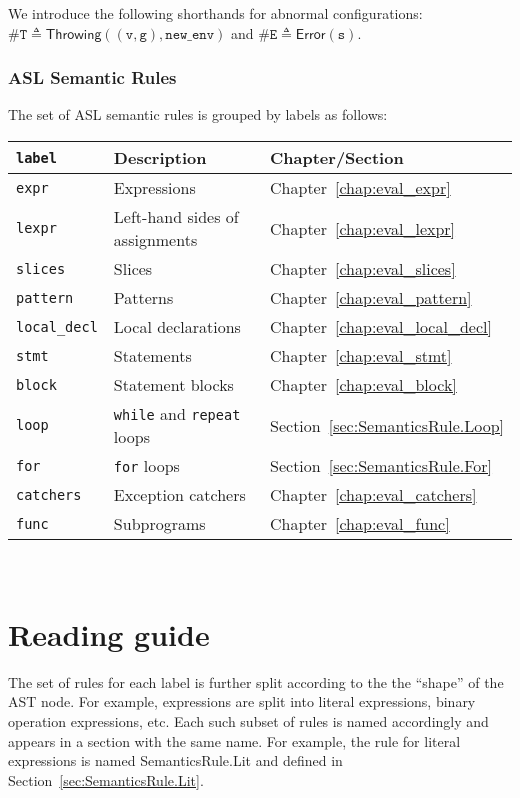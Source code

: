 \documentclass{book}
\newcommand\ExprThrowsConfig[0]{\texttt{\#T}}
\newcommand\ErrorConfig[0]{\texttt{\#E}}
\newcommand\Throwing[0]{\textsf{Throwing}}
\newcommand\Error[0]{\textsf{Error}}
\newcommand\newenv[0]{\texttt{new\_env}}
\newcommand\vg[0]{\texttt{g}}
\newcommand\vv[0]{\texttt{v}}
\newcommand\vs[0]{\texttt{s}}
\begin{document}
We introduce the following shorthands for abnormal configurations:
$\ExprThrowsConfig \triangleq \Throwing((\vv, \vg), \newenv)$
and $\ErrorConfig \triangleq \Error(\vs)$.

\subsection{ASL Semantic Rules}

The set of ASL semantic rules is grouped by labels as follows:

\begin{tabular}{lll}
\textbf{\texttt{label}} & \textbf{Description} & \textbf{Chapter/Section} \\
\hline
\texttt{expr} & Expressions & Chapter~\ref{chap:eval_expr}\\
\texttt{lexpr} & Left-hand sides of assignments & Chapter~\ref{chap:eval_lexpr}\\
\texttt{slices} & Slices & Chapter~\ref{chap:eval_slices}\\
\texttt{pattern} & Patterns & Chapter~\ref{chap:eval_pattern}\\
\texttt{local\_decl} & Local declarations & Chapter~\ref{chap:eval_local_decl}\\
\texttt{stmt} & Statements & Chapter~\ref{chap:eval_stmt}\\
\texttt{block} & Statement blocks & Chapter~\ref{chap:eval_block}\\
\texttt{loop} & \texttt{while} and \texttt{repeat} loops & Section~\ref{sec:SemanticsRule.Loop}\\
\texttt{for} & \texttt{for} loops & Section~\ref{sec:SemanticsRule.For}\\
\texttt{catchers} & Exception catchers & Chapter~\ref{chap:eval_catchers}\\
\texttt{func} & Subprograms & Chapter~\ref{chap:eval_func}
\end{tabular}\\

\chapter{Reading guide}

The set of rules for each label is further split according to the the ``shape'' of the AST node.
For example, expressions are split into literal expressions, binary operation expressions, etc.
Each such subset of rules is named accordingly and appears in a section with the same name.
For example, the rule for literal expressions is named SemanticsRule.Lit and defined in
Section~\ref{sec:SemanticsRule.Lit}.
\end{document}
